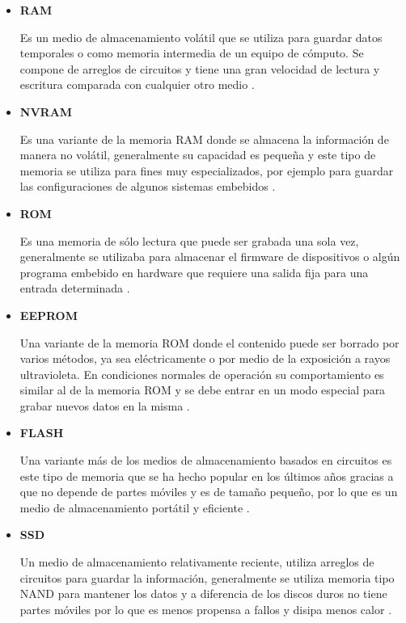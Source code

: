\begin{itemize}

  \item \textbf{RAM}

Es un medio de almacenamiento vol\'{a}til que se utiliza para guardar datos temporales o como memoria intermedia de un equipo de c\'{o}mputo. Se compone de arreglos de circuitos y tiene una gran velocidad de lectura y escritura comparada con cualquier otro medio \cite{_rom_????}.

  \item \textbf{NVRAM}

Es una variante de la memoria \textsc{RAM} donde se almacena la informaci\'{o}n de manera no vol\'{a}til, generalmente su capacidad es peque\~{n}a y este tipo de memoria se utiliza para fines muy especializados, por ejemplo para guardar las configuraciones de algunos sistemas embebidos \cite{veenstra_random_1986}.

  \item \textbf{ROM}

Es una memoria de s\'{o}lo lectura que puede ser grabada una sola vez, generalmente se utilizaba para almacenar el firmware de dispositivos o alg\'{u}n programa embebido en hardware que requiere una salida fija para una entrada determinada \cite{_rom_????}.

  \item \textbf{EEPROM}

Una variante de la memoria \textsc{ROM} donde el contenido puede ser borrado por varios m\'{e}todos, ya sea el\'{e}ctricamente o por medio de la exposici\'{o}n a rayos ultravioleta. En condiciones normales de operaci\'{o}n su comportamiento es similar al de la memoria \textsc{ROM} y se debe entrar en un modo especial para grabar nuevos datos en la misma \cite{_rom_????-1}.

  \item \textbf{FLASH}

Una variante m\'{a}s de los medios de almacenamiento basados en circuitos es este tipo de memoria que se ha hecho popular en los \'{u}ltimos a\~{n}os gracias a que no depende de partes m\'{o}viles y es de tama\~{n}o peque\~{n}o, por lo que es un medio de almacenamiento port\'{a}til y eficiente \cite{_flashmemguide.pdf_????}.

  \item \textbf{SSD}

Un medio de almacenamiento relativamente reciente, utiliza arreglos de circuitos para guardar la informaci\'{o}n, generalmente se utiliza memoria tipo \textsc{NAND} para mantener los datos y a diferencia de los discos duros no tiene partes m\'{o}viles por lo que es menos propensa a fallos y disipa menos calor \cite{_ssd-faq-us.pdf_????}.

\end{itemize}

